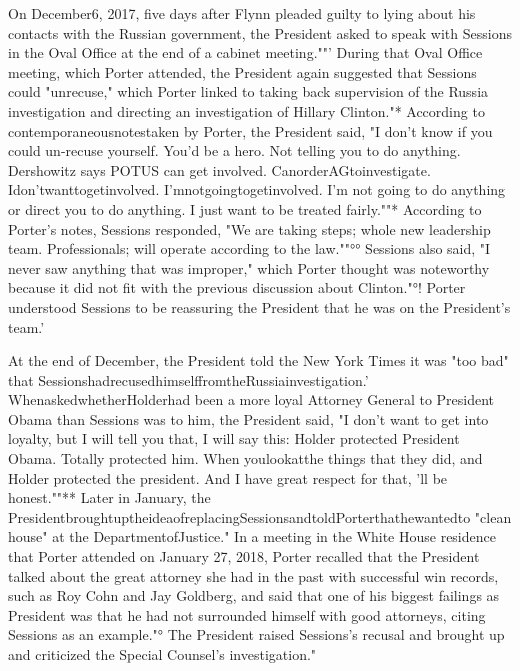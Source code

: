On December6, 2017, five days after Flynn pleaded guilty to lying about his contacts with the Russian government, the President asked to speak with Sessions in the Oval Office at the end of a cabinet meeting.""'
During that Oval Office meeting, which Porter attended, the President again suggested that Sessions could "unrecuse," which Porter linked to taking back supervision of the Russia investigation and directing an investigation of Hillary Clinton."*
According to contemporaneousnotestaken by Porter, the President said, "I don't know if you could un-recuse yourself.
You'd be a hero.
Not telling you to do anything.
Dershowitz says POTUS can get involved.
CanorderAGtoinvestigate.
Idon'twanttogetinvolved.
I'mnotgoingtogetinvolved.
I'm not going to do anything or direct you to do anything.
I just want to be treated fairly.""*
According to Porter's notes, Sessions responded, "We are taking steps; whole new leadership team.
Professionals; will operate according to the law.""°°
Sessions also said, "I never saw anything that was improper," which Porter thought was noteworthy because it did not fit with the previous discussion about Clinton."°!
Porter understood Sessions to be reassuring the President that he was on the President's team.'

At the end of December, the President told the New York Times it was "too bad" that SessionshadrecusedhimselffromtheRussiainvestigation.'
WhenaskedwhetherHolderhad been a more loyal Attorney General to President Obama than Sessions was to him, the President said, "I don't want to get into loyalty, but I will tell you that, I will say this: Holder protected President Obama.
Totally protected him.
When youlookatthe things that they did, and Holder protected the president.
And I have great respect for that, 'll be honest.""** Later in January, the PresidentbroughtuptheideaofreplacingSessionsandtoldPorterthathewantedto "clean house" at the DepartmentofJustice."
In a meeting in the White House residence that Porter attended on January 27, 2018, Porter recalled that the President talked about the great attorney she had in the past with successful win records, such as Roy Cohn and Jay Goldberg, and said that one of his biggest failings as President was that he had not surrounded himself with good attorneys, citing Sessions as an example."°
The President raised Sessions's recusal and brought up and criticized the Special Counsel's investigation."

